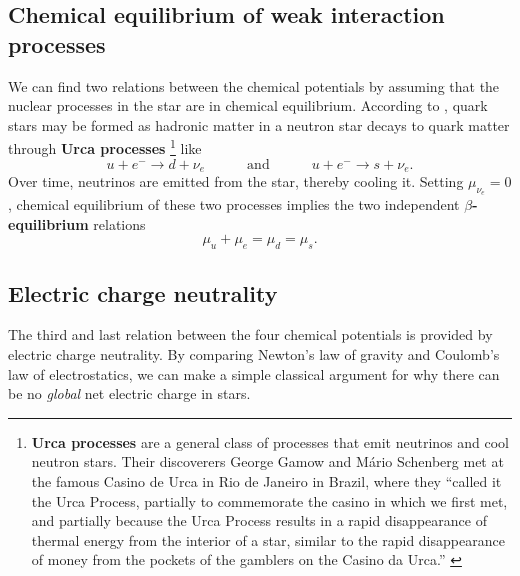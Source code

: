 \subsection*{Chemical equilibrium of weak interaction processes}

We can find two relations between the chemical potentials by assuming that the nuclear processes in the star are in chemical equilibrium.
According to \cite{ref:quark_star_processes}, quark stars may be formed as hadronic matter in a neutron star decays to quark matter through \textbf{Urca processes}%
\footnote{%
	\textbf{Urca processes} are a general class of processes that emit neutrinos and cool neutron stars.
	Their discoverers George Gamow and Mário Schenberg met at the famous Casino de Urca in Rio de Janeiro in Brazil,
	where they ``called it the Urca Process, partially to commemorate the casino in
	which we first met, and partially because the Urca Process
	results in a rapid disappearance of thermal energy from
	the interior of a star, similar to the rapid disappearance of
	money from the pockets of the gamblers on the Casino da
	Urca.'' \cite{ref:urca}
}
like
\begin{equation}
u + e^- \rightarrow d + \nu_e
\quad\qquad \text{and} \quad\qquad
u + e^- \rightarrow s + \nu_e .
\end{equation}
Over time, neutrinos are emitted from the star, thereby cooling it.
Setting $\mu_{\nu_e}=0$, chemical equilibrium of these two processes implies the two independent \textbf{$\beta$-equilibrium} relations
\begin{equation}
\mu_u + \mu_e = \mu_d = \mu_s .
\label{eq:lsm:chemical_equilibrium}
\end{equation}

\subsection*{Electric charge neutrality}

The third and last relation between the four chemical potentials is provided by electric charge neutrality.
By comparing Newton's law of gravity and Coulomb's law of electrostatics,
we can make a simple classical argument for why there can be no \emph{global} net electric charge in stars.

